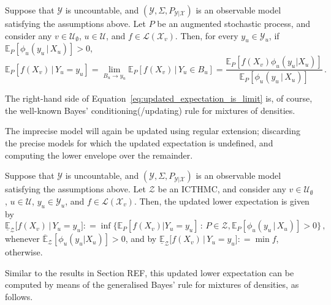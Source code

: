 \documentclass[twoside,11pt]{article}
\newcommand{\states}{\mathcal{X}}
\newcommand{\observs}{\mathcal{Y}}
\newcommand{\gambles}{\mathcal{L}}
\newcommand{\coloneqq}{:\!=}
\begin{document}

\begin{proposition}\label{prop:precise_bayes_rule_densities}
Suppose that $\observs$ is uncountable, and $(\observs,\Sigma,P_{\observs\vert\states})$ is an observable model satisfying the assumptions above. Let $P$ be an augmented stochastic process, and consider any $v\in\mathcal{U}_\emptyset$, $u\in\mathcal{U}$, and $f\in\gambles(\states_v)$. Then, for every $y_u\in\observs_u$, if $\mathbb{E}_P[\phi_u(y_u\,\vert\,X_u)]>0$,
\begin{equation}\label{eq:updated_expectation_is_limit}
\mathbb{E}_P[f(X_v)\,\vert\,Y_u=y_u] = \lim_{B_u\to y_u} \mathbb{E}_P[f(X_v)\,\vert\,Y_u\in B_u] = \frac{\mathbb{E}_P[f(X_v)\phi_u(y_u\vert X_u)]}{\mathbb{E}_P[\phi_u(y_u\,\vert\,X_u)]}\,.
\end{equation}
\end{proposition}
The right-hand side of Equation~\eqref{eq:updated_expectation_is_limit} is, of course, the well-known Bayes' conditioning(/updating) rule for mixtures of densities. 

The imprecise model will again be updated using regular extension; discarding the precise models for which the updated expectation is undefined, and computing the lower envelope over the remainder.
\begin{definition}
Suppose that $\observs$ is uncountable, and $(\observs,\Sigma,P_{\observs\vert\states})$ is an observable model satisfying the assumptions above. Let $\mathcal{Z}$ be an ICTHMC, and consider any $v\in\mathcal{U}_\emptyset$, $u\in\mathcal{U}$, $y_u\in\observs_u$, and $f\in\gambles(\states_v)$. Then, the updated lower expectation is given by 
\begin{equation*}
\underline{\mathbb{E}}_{\mathcal{Z}}\bigl[f(X_v)\,\vert\,Y_u = y_u\bigr] \coloneqq \inf\{\mathbb{E}_P[f(X_v)\vert Y_u=y_u]\,:\,P\in\mathcal{Z}, \mathbb{E}_P[\phi_u(y_u\,\vert\,X_u)]>0\}\,,
\end{equation*}
whenever $\overline{\mathbb{E}}_\mathcal{Z}[\phi_u(y_u\vert X_u)] >0$, and by $\underline{\mathbb{E}}_{\mathcal{Z}}\bigl[f(X_v)\,\vert\,Y_u=y_u\bigr]\coloneqq\min f$, otherwise.
\end{definition}

Similar to the results in Section REF, this updated lower expectation can be computed by means of the generalised Bayes' rule for mixtures of densities, as follows.
\end{document}
